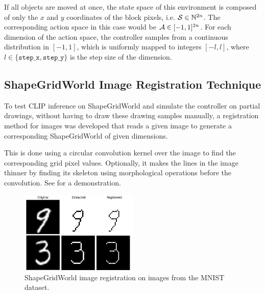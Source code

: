 If all objects are moved at once, the state space of this environment is composed of only the \(x\) and \(y\) coordinates of the block pixels, i.e. \(\mathcal{S} \in \mathbb{N}^{2 n}\).
The corresponding action space in this case would be \(\mathcal{A} \in [-1, 1]^{2 n}\).
For each dimension of the action space, the controller samples from a continuous distribution in \([-1, 1]\), which is uniformly mapped to integers \([-l, l]\), where \(l \in \{\texttt{step\_x}, \texttt{step\_y}\}\) is the step size of the dimension.

\subsection{ShapeGridWorld Image Registration Technique}
\label{sec:sgw-registration}

To test CLIP inference on ShapeGridWorld and simulate the controller on partial drawings, without having to draw these drawing samples manually, a registration method for images was developed that reads a given image to generate a corresponding ShapeGridWorld of given dimensions.

This is done using a circular convolution kernel over the image to find the corresponding grid pixel values.
Optionally, it makes the lines in the image thinner by finding its skeleton using morphological operations before the convolution.
See  for a demonstration.

\begin{figure}[h]
    \centering
    \includegraphics[width=0.5\textwidth]{images/grid_registration.png}
    \caption{ShapeGridWorld image registration on images from the MNIST dataset.}
    \label{fig:sgw-registration}
\end{figure}

